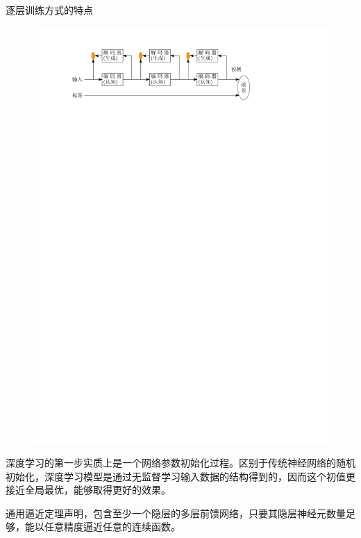 \begin{note}
    逐层训练方式的特点
    \begin{figure}[htbp]
        \centering
        \includegraphics{image/逐层训练方式的特点.pdf}
    \end{figure}

    深度学习的第一步实质上是一个网络参数初始化过程。区别于传统神经网络的随机初始化，深度学习模型是通过无监督学习输入数据的结构得到的，因而这个初值更接近全局最优，能够取得更好的效果。
\end{note}
\begin{theorem}[通用逼近定理]
    通用逼近定理声明，包含至少一个隐层的多层前馈网络，只要其隐层神经元数量足够，能以任意精度逼近任意的连续函数。
\end{theorem}
